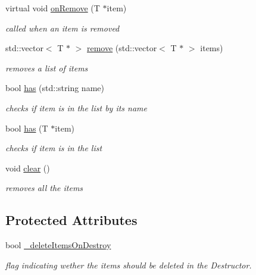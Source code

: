 \begin{DoxyCompactItemize}
virtual void \hyperlink{classdrobot_1_1object_1_1Manager_a17b34bb3d364509c925a7dade1fef14b}{on\-Remove} (T $\ast$item)
\begin{DoxyCompactList}\small\item\em called when an item is removed \end{DoxyCompactList}\item 
std\-::vector$<$ T $\ast$ $>$ \hyperlink{classdrobot_1_1object_1_1Manager_a47e24b1186210a6232f8da62551902fb}{remove} (std\-::vector$<$ T $\ast$ $>$ items)
\begin{DoxyCompactList}\small\item\em removes a list of items \end{DoxyCompactList}\item 
bool \hyperlink{classdrobot_1_1object_1_1Manager_a4bde99ebbba5be83e3d6144c75335bf5}{has} (std\-::string name)
\begin{DoxyCompactList}\small\item\em checks if item is in the list by its name \end{DoxyCompactList}\item 
bool \hyperlink{classdrobot_1_1object_1_1Manager_ae7d90ba11895c86b957ac4b81851a0d7}{has} (T $\ast$item)
\begin{DoxyCompactList}\small\item\em checks if item is in the list \end{DoxyCompactList}\item 
\hypertarget{classdrobot_1_1object_1_1Manager_ae40cda4743e17cc7736b24db57e53268}{void \hyperlink{classdrobot_1_1object_1_1Manager_ae40cda4743e17cc7736b24db57e53268}{clear} ()}\label{classdrobot_1_1object_1_1Manager_ae40cda4743e17cc7736b24db57e53268}

\begin{DoxyCompactList}\small\item\em removes all the items \end{DoxyCompactList}\end{DoxyCompactItemize}
\subsection*{Protected Attributes}
\begin{DoxyCompactItemize}
\item 
\hypertarget{classdrobot_1_1object_1_1Manager_af54347142e8014f7faa02acb14f7ace3}{bool \hyperlink{classdrobot_1_1object_1_1Manager_af54347142e8014f7faa02acb14f7ace3}{\-\_\-delete\-Items\-On\-Destroy}}\label{classdrobot_1_1object_1_1Manager_af54347142e8014f7faa02acb14f7ace3}

\begin{DoxyCompactList}\small\item\em flag indicating wether the items should be deleted in the Destructor. \end{DoxyCompactList}\end{DoxyCompactItemize}
